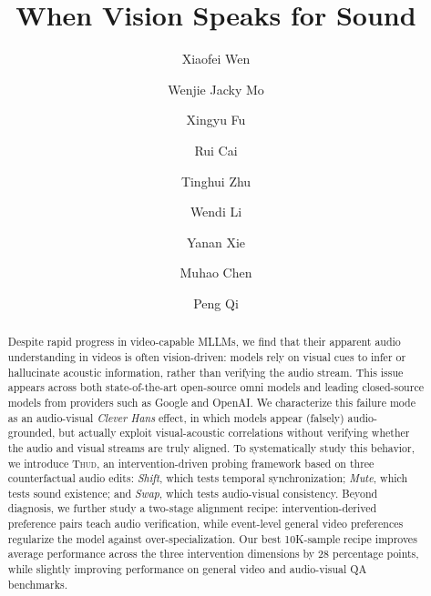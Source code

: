 \documentclass{llmxive}
\title{When Vision Speaks for Sound}
\author{Xiaofei Wen \and Wenjie Jacky Mo \and Xingyu Fu \and Rui Cai \and Tinghui Zhu \and Wendi Li \and Yanan Xie \and Muhao Chen \and Peng Qi}
\providecommand{\Thud}{\textsc{Thud}\xspace}
\providecommand{\peng}[1]{{[\textbf{Peng:} #1]}}
\begin{document}
\maketitle
\begin{abstract}
Despite rapid progress in video-capable MLLMs, we find that their apparent audio understanding in videos is often vision-driven: models rely on visual cues to infer or hallucinate acoustic information, rather than verifying the audio stream. This issue appears across both state-of-the-art open-source omni models and leading closed-source models from providers such as Google and OpenAI. We characterize this failure mode as an audio-visual \textit{Clever Hans} effect, in which models appear (falsely) audio-grounded, but actually exploit visual-acoustic correlations without verifying whether the audio and visual streams are truly aligned.
To systematically study this behavior, we introduce \Thud, an intervention-driven probing framework based on three counterfactual audio edits: \textit{Shift}, which tests temporal synchronization; \textit{Mute}, which tests sound existence; and \textit{Swap}, which tests audio-visual consistency. Beyond diagnosis, we further study a two-stage alignment recipe: intervention-derived preference pairs teach audio verification, while event-level general video preferences regularize the model against over-specialization. Our best 10K-sample recipe improves average performance across the three intervention dimensions by 28 percentage points, while slightly improving performance on general video and audio-visual QA benchmarks.



\end{abstract}
\vspace{-1.5em}
\end{document}
